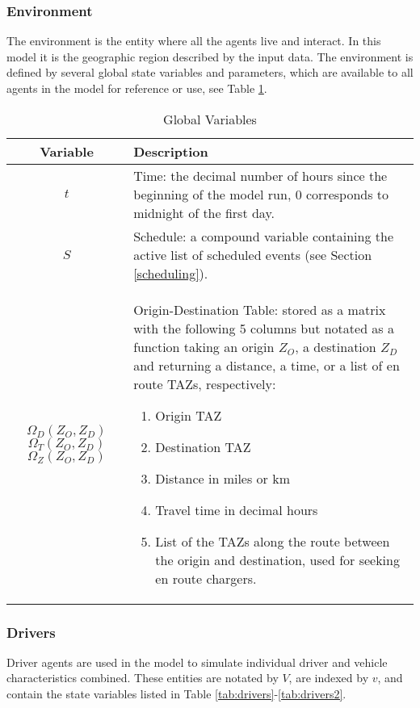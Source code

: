 \documentclass[journal]{IEEEtran}
\begin{document}
\subsubsection{Environment}
The environment is the entity where all the agents live and interact. In this model it is the geographic region described by the input data. The environment is defined by several global state variables and parameters, which are available to all agents in the model for reference or use, see Table \ref{tab:globals}. 

\begin{table}[!h]
\def\colmargin{6.75cm}
\renewcommand{\arraystretch}{1.3}
\caption{Global Variables}
\label{tab:globals}
\centering
\begin{tabular}{|cl|}
\hline
Variable & Description\\
\hline
$t$ & \parbox[t]{\colmargin}{ \raggedright Time: the decimal number of hours since the beginning of the model run, 0 corresponds to midnight of the first day.}\\
$S$ &	\parbox[t]{\colmargin}{ \raggedright Schedule: a compound variable containing the active list of scheduled events (see Section \ref{scheduling}). }\\
\parbox[t]{1.5cm}{$\Omega_D(Z_O,Z_D)$
$\Omega_T(Z_O,Z_D)$
$\Omega_Z(Z_O,Z_D)$}&	\parbox[t]{\colmargin}{ \raggedright Origin-Destination Table: stored as a matrix with the following 5 columns but notated as a function taking an origin $Z_O$, a destination $Z_D$ and returning a distance, a time, or a list of en route TAZs, respectively: 
\begin{enumerate}
  \item	Origin TAZ
  \item Destination TAZ
  \item Distance in miles or km
  \item Travel time in decimal hours
  \item List of the TAZs along the route between the origin and destination, used for seeking en route chargers. 
\end{enumerate}
}\\
\hline
\end{tabular}
\end{table}

\subsubsection{Drivers}
Driver agents are used in the model to simulate individual driver and vehicle characteristics combined. These entities are notated by $V$, are indexed by $v$, and contain the state variables listed in Table \ref{tab:drivers}-\ref{tab:drivers2}.
\end{document}
